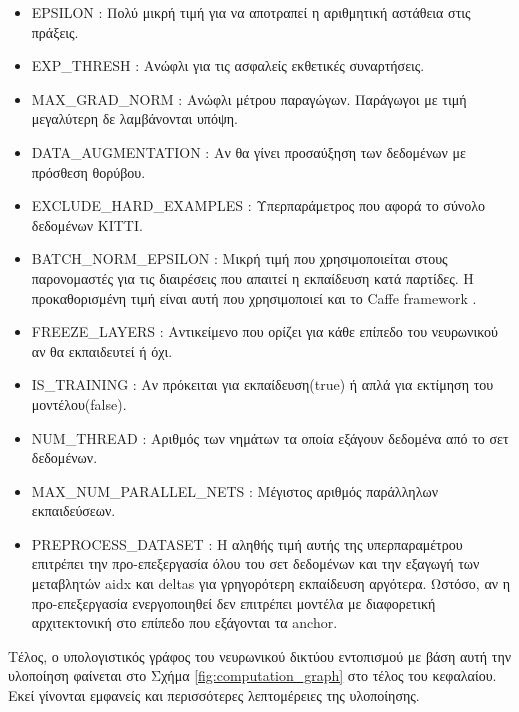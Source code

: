 \begin{itemize}
\item \textcolor{LstItemCol}{EPSILON} : Πολύ μικρή τιμή για να αποτραπεί η αριθμητική αστάθεια στις πράξεις.
\item \textcolor{LstItemCol}{EXP\_THRESH} : Ανώφλι για τις ασφαλείς εκθετικές συναρτήσεις.
\item \textcolor{LstItemCol}{MAX\_GRAD\_NORM} : Ανώφλι μέτρου παραγώγων. Παράγωγοι με τιμή μεγαλύτερη δε λαμβάνονται υπόψη.
\item \textcolor{LstItemCol}{DATA\_AUGMENTATION} : Αν θα γίνει προσαύξηση των δεδομένων με πρόσθεση θορύβου.
\item \textcolor{LstItemCol}{EXCLUDE\_HARD\_EXAMPLES} : Υπερπαράμετρος που αφορά το σύνολο δεδομένων KITTI.
\item \textcolor{LstItemCol}{BATCH\_NORM\_EPSILON} : Μικρή τιμή που χρησιμοποιείται στους παρονομαστές για τις διαιρέσεις που απαιτεί η εκπαίδευση κατά παρτίδες. Η προκαθορισμένη τιμή είναι αυτή που χρησιμοποιεί και το Caffe framework \cite{101}.
\item \textcolor{LstItemCol}{FREEZE\_LAYERS} : Αντικείμενο που ορίζει για κάθε επίπεδο του νευρωνικού αν θα εκπαιδευτεί ή όχι.
\item \textcolor{LstItemCol}{IS\_TRAINING} : Αν πρόκειται για εκπαίδευση(true) ή απλά για εκτίμηση του μοντέλου(false).
\item \textcolor{LstItemCol}{NUM\_THREAD} : Αριθμός των νημάτων τα οποία εξάγουν δεδομένα από το σετ δεδομένων.
\item \textcolor{LstItemCol}{MAX\_NUM\_PARALLEL\_NETS} : Μέγιστος αριθμός παράλληλων εκπαιδεύσεων.
\item \textcolor{LstItemCol}{PREPROCESS\_DATASET} : Η αληθής τιμή αυτής της υπερπαραμέτρου επιτρέπει την προ-επεξεργασία όλου του σετ δεδομένων και την εξαγωγή των μεταβλητών aidx και deltas για γρηγορότερη εκπαίδευση αργότερα. Ωστόσο, αν η προ-επεξεργασία ενεργοποιηθεί δεν επιτρέπει μοντέλα με διαφορετική αρχιτεκτονική στο επίπεδο που εξάγονται τα anchor.
\end{itemize}

Τέλος, ο υπολογιστικός γράφος του νευρωνικού δικτύου εντοπισμού με βάση αυτή την υλοποίηση φαίνεται στο Σχήμα \ref{fig:computation_graph} στο τέλος του κεφαλαίου. Εκεί γίνονται εμφανείς και περισσότερες λεπτομέρειες της υλοποίησης.

